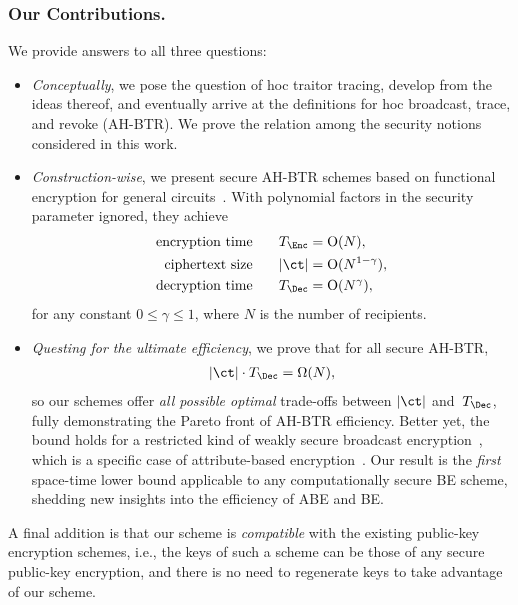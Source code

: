 \subsubsection{Our Contributions.}
We provide answers to all three questions:
\begin{itemize}
\item \emph{Conceptually}, we pose the question of \ad hoc traitor tracing,
develop from the ideas thereof, and
eventually arrive at the definitions for \ad hoc broadcast, trace, and revoke (AH-BTR).
We prove the relation among the security notions considered in this work.
\item \emph{Construction-wise},
we present secure AH-BTR schemes based on functional encryption for general circuits~\cite{TCC:BonSahWat11}.
With polynomial factors in the security parameter ignored,
they achieve
\begin{align*}
\textup{encryption time}\qquad\qquad\mathllap{T_\Enc}&{}=\bigO(N),\\
\textup{ciphertext size}\qquad\qquad\mathllap{|\ct|}&{}=\bigO(N^{1-\gamma}),\\
\textup{decryption time}\qquad\qquad\mathllap{T_\Dec}&{}=\bigO(N^\gamma),
\end{align*}
for any constant ${0\leq\gamma\leq 1}$,
where $N$ is the number of recipients.
\item \emph{Questing for the ultimate efficiency},
we prove that for all secure AH-BTR,
\begin{align*}
|\ct|\cdot T_\Dec=\bigOmega(N),
\end{align*}
so our schemes offer \emph{all possible optimal} trade-offs between $|\ct|$ and~$T_\Dec$,
fully demonstrating the Pareto front of AH-BTR efficiency.
Better yet, the bound holds for a restricted kind of weakly secure broadcast encryption~\cite{C:FiaNao93},
which is a specific case of attribute-based encryption~\cite{EC:SahWat05,CCS:GPSW06}.
Our result is the \emph{first} space-time lower bound applicable to any computationally secure BE scheme,
shedding new insights into the efficiency of ABE and BE.
\end{itemize}
A final addition is that our scheme is \emph{compatible} with the existing public-key encryption schemes,
i.e., the keys of such a scheme can be those of any secure public-key encryption, and
there is no need to regenerate keys to take advantage of our scheme.

